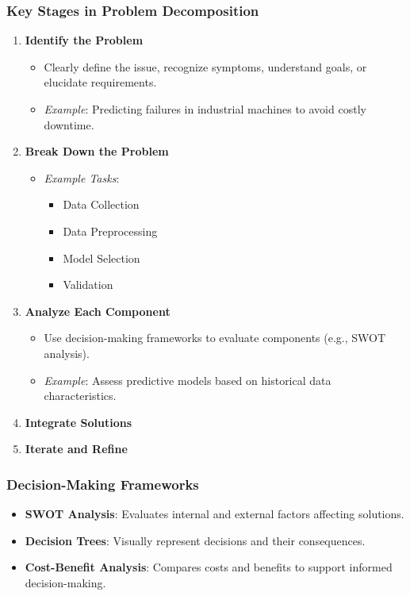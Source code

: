 \documentclass[aspectratio=169]{beamer}
\begin{document}
\begin{frame}[fragile]
    \frametitle{Key Stages in Problem Decomposition}
    \begin{enumerate}
        \item \textbf{Identify the Problem}
            \begin{itemize}
                \item Clearly define the issue, recognize symptoms, understand goals, or elucidate requirements.
                \item \textit{Example}: Predicting failures in industrial machines to avoid costly downtime.
            \end{itemize}
        \item \textbf{Break Down the Problem}
            \begin{itemize}
                \item \textit{Example Tasks}:
                \begin{itemize}
                    \item Data Collection
                    \item Data Preprocessing
                    \item Model Selection
                    \item Validation
                \end{itemize}
            \end{itemize}
        \item \textbf{Analyze Each Component}
            \begin{itemize}
                \item Use decision-making frameworks to evaluate components (e.g., SWOT analysis).
                \item \textit{Example}: Assess predictive models based on historical data characteristics.
            \end{itemize}
        \item \textbf{Integrate Solutions}
        \item \textbf{Iterate and Refine}
    \end{enumerate}
\end{frame}

\begin{frame}[fragile]
    \frametitle{Decision-Making Frameworks}
    \begin{itemize}
        \item \textbf{SWOT Analysis}: Evaluates internal and external factors affecting solutions.
        \item \textbf{Decision Trees}: Visually represent decisions and their consequences.
        \item \textbf{Cost-Benefit Analysis}: Compares costs and benefits to support informed decision-making.
    \end{itemize}
\end{frame}
\end{document}
